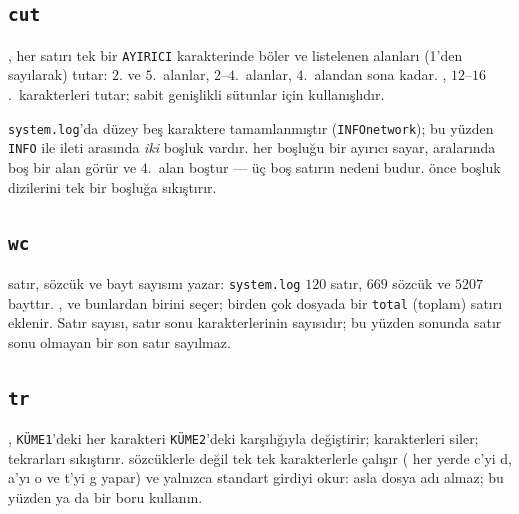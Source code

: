 \subsection{\texttt{cut}}



, her satırı tek bir \texttt{AYIRICI} karakterinde böler ve listelenen alanları (1'den sayılarak) tutar:  $2$. ve $5$.~alanlar,  $2$--$4$.~alanlar,  $4$.~alandan sona kadar. , $12$--$16$.~karakterleri tutar; sabit genişlikli sütunlar için kullanışlıdır.

\texttt{system.log}'da düzey beş karaktere tamamlanmıştır (\texttt{INFO\textvisiblespace\textvisiblespace network}); bu yüzden \texttt{INFO} ile ileti arasında \emph{iki} boşluk vardır.  her boşluğu bir ayırıcı sayar, aralarında boş bir alan görür ve $4$.~alan boştur --- üç boş satırın nedeni budur.  önce boşluk dizilerini tek bir boşluğa sıkıştırır.

\subsection{\texttt{wc}}



 satır, sözcük ve bayt sayısını yazar: \texttt{system.log} $120$ satır, $669$ sözcük ve $5207$ bayttır. ,  ve  bunlardan birini seçer; birden çok dosyada bir \texttt{total} (toplam) satırı eklenir. Satır sayısı, satır sonu karakterlerinin sayısıdır; bu yüzden sonunda satır sonu olmayan bir son satır sayılmaz.

\subsection{\texttt{tr}}



, \texttt{KÜME1}'deki her karakteri \texttt{KÜME2}'deki karşılığıyla değiştirir;  karakterleri siler;  tekrarları sıkıştırır.  sözcüklerle değil tek tek karakterlerle çalışır ( her yerde c'yi d, a'yı o ve t'yi g yapar) ve yalnızca standart girdiyi okur: asla dosya adı almaz; bu yüzden \cmd{<} ya da bir boru kullanın.

